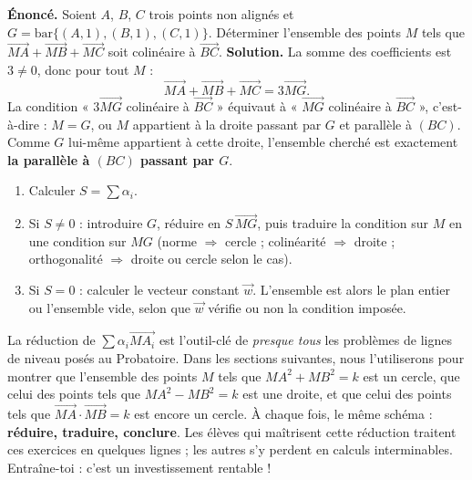 \documentclass[11pt]{article}
\begin{document}
\begin{exoresolu}
\textbf{Énoncé.} Soient $A$, $B$, $C$ trois points non alignés et $G = \mathrm{bar}\{(A,1),(B,1),(C,1)\}$. Déterminer l'ensemble des points $M$ tels que $\overrightarrow{MA} + \overrightarrow{MB} + \overrightarrow{MC}$ soit colinéaire à $\overrightarrow{BC}$.
\tcblower
\textbf{Solution.} La somme des coefficients est $3 \neq 0$, donc pour tout $M$ :
\[
\overrightarrow{MA} + \overrightarrow{MB} + \overrightarrow{MC} = 3\overrightarrow{MG}.
\]
La condition « $3\overrightarrow{MG}$ colinéaire à $\overrightarrow{BC}$ » équivaut à « $\overrightarrow{MG}$ colinéaire à $\overrightarrow{BC}$ », c'est-à-dire : $M = G$, ou $M$ appartient à la droite passant par $G$ et parallèle à $(BC)$. Comme $G$ lui-même appartient à cette droite, l'ensemble cherché est exactement \textbf{la parallèle à $(BC)$ passant par $G$}.
\end{exoresolu}

\begin{methode}
\begin{enumerate}
\item Calculer $S = \sum \alpha_i$.
\item Si $S \neq 0$ : introduire $G$, réduire en $S\,\overrightarrow{MG}$, puis traduire la condition sur $M$ en une condition sur $MG$ (norme $\Rightarrow$ cercle ; colinéarité $\Rightarrow$ droite ; orthogonalité $\Rightarrow$ droite ou cercle selon le cas).
\item Si $S = 0$ : calculer le vecteur constant $\vec{w}$. L'ensemble est alors le plan entier ou l'ensemble vide, selon que $\vec{w}$ vérifie ou non la condition imposée.
\end{enumerate}
\end{methode}

\begin{savaistu}
La réduction de $\sum \alpha_i \overrightarrow{MA_i}$ est l'outil-clé de \emph{presque tous} les problèmes de lignes de niveau posés au Probatoire. Dans les sections suivantes, nous l'utiliserons pour montrer que l'ensemble des points $M$ tels que $MA^2 + MB^2 = k$ est un cercle, que celui des points tels que $MA^2 - MB^2 = k$ est une droite, et que celui des points tels que $\overrightarrow{MA} \cdot \overrightarrow{MB} = k$ est encore un cercle. À chaque fois, le même schéma : \textbf{réduire, traduire, conclure}. Les élèves qui maîtrisent cette réduction traitent ces exercices en quelques lignes ; les autres s'y perdent en calculs interminables. Entraîne-toi : c'est un investissement rentable !
\end{savaistu}
\end{document}
